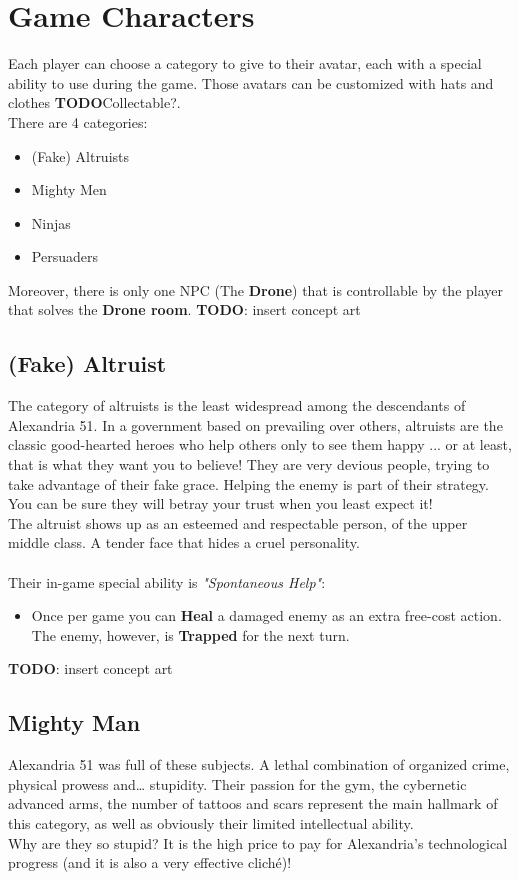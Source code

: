 \section{Game Characters}

Each player can choose a category to give to their avatar, each with a special ability to use during the game. Those avatars can be customized with hats and clothes \textbf{TODO}Collectable?.\\
There are 4 categories:\\
\begin{itemize}
	\item (Fake) Altruists
	\item Mighty Men
	\item Ninjas
	\item Persuaders
\end{itemize}
Moreover, there is only one NPC (The \textbf{Drone}) that is controllable by the player that solves the \textbf{Drone room}.
\textbf{TODO}: insert concept art 

\subsection{(Fake) Altruist}
The category of altruists is the least widespread among the descendants of Alexandria 51. In a government based on prevailing over others, altruists are the classic good-hearted heroes who help others only to see them happy ... or at least, that is what they want you to believe! They are very devious people,
trying to take advantage of their fake grace. Helping the enemy is part of their strategy. You can be sure they will betray your trust when you least expect it!\\
The altruist shows up as an esteemed and respectable person, of the upper middle class. A tender face that hides a cruel personality.\\\\
Their in-game special ability is  \textit{"Spontaneous Help"}:
\begin{itemize}
\item Once per game you can \textbf{Heal} a damaged enemy as an extra free-cost action. The enemy, however, is \textbf{Trapped} for the next turn.
\end{itemize}
\textbf{TODO}: insert concept art
\subsection{Mighty Man}
Alexandria 51 was full of these subjects. A lethal combination of organized crime, physical prowess and… stupidity. Their passion for the gym, the cybernetic advanced arms, the number of tattoos and scars represent the main hallmark of this category, as well as obviously their limited intellectual ability.\\
Why are they so stupid? It is the high price to pay for Alexandria's technological progress (and it is also a very effective cliché)!\\\\

